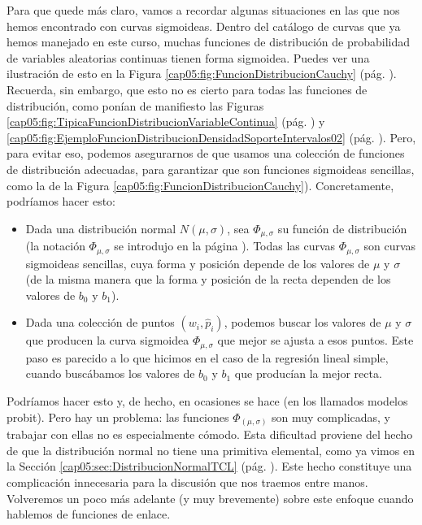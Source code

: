 Para que quede más claro, vamos a recordar algunas situaciones en las que nos hemos encontrado con curvas sigmoideas. Dentro del catálogo de curvas que ya hemos manejado en este curso, muchas funciones de distribuci\'on de probabilidad de variables aleatorias continuas tienen
forma sigmoidea. Puedes ver una ilustración de esto en la Figura
\ref{cap05:fig:FuncionDistribucionCauchy} (pág.  \pageref{cap05:fig:FuncionDistribucionCauchy}).
Recuerda, sin embargo, que esto no es cierto para todas las funciones de distribuci\'on, como pon\'ian de manifiesto las Figuras \ref{cap05:fig:TipicaFuncionDistribucionVariableContinua}
(pág.  \pageref{cap05:fig:TipicaFuncionDistribucionVariableContinua}) y
\ref{cap05:fig:EjemploFuncionDistribucionDensidadSoporteIntervalos02}
(pág.  \pageref{cap05:fig:EjemploFuncionDistribucionDensidadSoporteIntervalos02}).
Pero, para evitar eso, podemos asegurarnos de que usamos una colección de funciones de distribución adecuadas, para garantizar que son funciones sigmoideas sencillas, como la de la Figura
\ref{cap05:fig:FuncionDistribucionCauchy}). Concretamente, podríamos hacer esto:
\begin{itemize}
  \item Dada una distribución normal $N(\mu,\sigma)$, sea $\Phi_{\mu,\sigma}$ su función de distribución (la notación $\Phi_{\mu,\sigma}$\index{$\Phi_{\mu,\sigma}$} se introdujo en la página \pageref{ch06:ecu:NotacionPhiFuncionDistribucionZ}). Todas las curvas $\Phi_{\mu,\sigma}$ son curvas sigmoideas sencillas, cuya forma y posición depende de los valores de $\mu$ y $\sigma$ (de la misma manera que la forma y posición de la recta dependen de los valores de $b_0$ y $b_1$).
  \item Dada una colección de puntos $(w_i,\hat p_i)$, podemos buscar los valores de $\mu$ y $\sigma$ que producen la curva sigmoidea $\Phi_{\mu,\sigma}$ que mejor se ajusta a esos puntos. Este paso es parecido a lo que hicimos en el caso de la regresión lineal simple, cuando buscábamos los valores de $b_0$ y $b_1$ que producían la mejor recta.
\end{itemize}
Podríamos hacer esto y, de hecho, en ocasiones se hace (en los llamados modelos {\sf probit}). Pero hay un problema: las funciones $\Phi_{(\mu,\sigma)}$ son muy complicadas, y trabajar con ellas no es especialmente cómodo. Esta dificultad proviene del hecho de que la distribución normal no tiene una primitiva elemental, como ya vimos en la Sección \ref{cap05:sec:DistribucionNormalTCL} (pág. \pageref{cap05:sec:DistribucionNormalTCL}). Este hecho constituye una complicación innecesaria para la discusión que nos traemos entre manos. Volveremos un poco más adelante (y muy brevemente) sobre este enfoque cuando hablemos de funciones de enlace.

